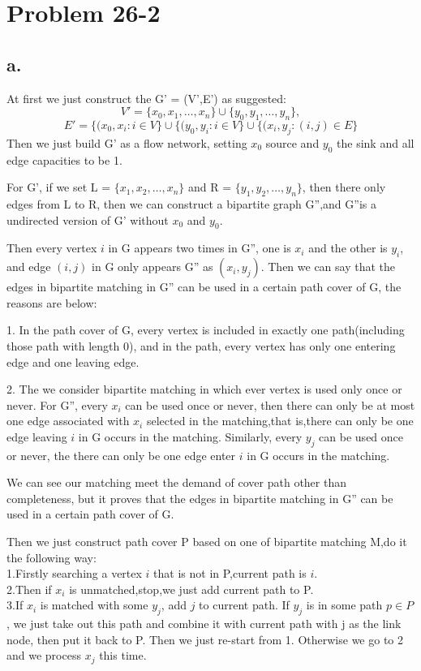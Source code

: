 \documentclass[oneside]{homework} %
\begin{document}
\maketitle
\newpage
\section {Problem 26-2}
\subsection*{a.}
At first we just construct the G' = (V',E') as suggested:
$$V' = \{x_{0},x_{1},\ldots,x_{n}\} \cup \{y_{0},y_{1},\ldots,y_{n}\},$$
$$E' = \{(x_{0},x_{i}:i\in V\} \cup \{(y_{0},y_{i}:i\in V\} \cup \{(x_{i},y_{j}:(i,j) \in E\} $$
Then we just build G' as a flow network, setting $x_{0}$ source and $y_{0}$ the sink and all edge capacities to be 1.

For G', if we set L = $\{x_{1},x_{2},\ldots,x_{n}\}$ and R = $\{y_{1},y_{2},\ldots,y_{n}\}$, then there only edges from L to R, then we can construct a bipartite graph G'',and G''is a undirected version of G' without $x_{0}$ and $y_{0}$. 

Then every vertex $i$ in G appears two times in G'', one is $x_{i}$ and the other is $y_{i}$, and edge $(i,j)$ in G only appears G'' as $(x_{i},y_{j})$. Then we can say that the edges in bipartite matching in G'' can be used in a certain path cover of G, the reasons are below:

1. In the path cover of G, every vertex is included in exactly one path(including those path with length 0), and in the path, every vertex has only one entering edge and one leaving edge.

2. The we consider bipartite matching in which ever vertex is used only once or never. For G'', every $x_{i}$ can be used once or never, then there can only be at most one edge associated with $x_{i}$ selected in the matching,that is,there can only be one edge leaving $i$ in G occurs in the matching. Similarly, every $y_{j}$ can be used once or never, the there can only be one edge enter $i$ in G occurs in the matching.

We can see our matching meet the demand of cover path other than completeness, but it proves that the edges in bipartite matching in G'' can be used in a certain path cover of G.

Then we just construct path cover P based on one of bipartite matching M,do it the following way:\\
1.Firstly searching a vertex $i$ that is not in P,current path is $i$.\\
2.Then if $x_{i}$ is unmatched,stop,we just add current path to P.\\
3.If $x_{i}$ is matched with some $y_{j}$, add $j$ to current path. If $y_{j}$ is in some path $p \in P$, we just take out this path and combine it with current path with j as the link node, then put it back to P. Then we just re-start from 1. Otherwise we go to 2 and we process $x_{j}$ this time.
\end{document}
